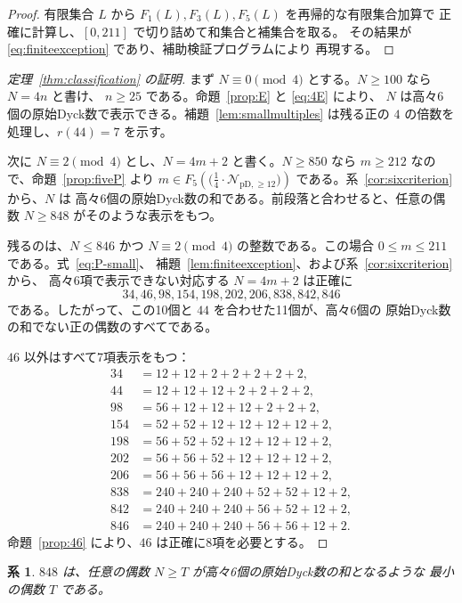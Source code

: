 \documentclass[12pt]{ltjsarticle}
\theoremstyle{plain}
\newtheorem{corollary}[theorem]{系}
\theoremstyle{definition}
\theoremstyle{plain}
\newcommand{\Pset}{%
  \bigl(\tfrac{1}{4}\cdot\mathcal{N}_{\mathrm{pD},\geq 12}\bigr)%
}
\begin{document}
\begin{proof}
有限集合 $L$ から $F_1(L),F_3(L),F_5(L)$ を再帰的な有限集合加算で
正確に計算し、$[0,211]$ で切り詰めて和集合と補集合を取る。
その結果が \eqref{eq:finiteexception} であり、補助検証プログラムにより
再現する。
\end{proof}

\begin{proof}[定理~\ref{thm:classification} の証明]
まず $N\equiv0\pmod4$ とする。$N\geq100$ なら $N=4n$ と書け、
$n\geq25$ である。命題~\ref{prop:E} と \eqref{eq:4E} により、
$N$ は高々6個の原始Dyck数で表示できる。補題~\ref{lem:smallmultiples}
は残る正の $4$ の倍数を処理し、$r(44)=7$ を示す。

次に $N\equiv2\pmod4$ とし、$N=4m+2$ と書く。$N\geq850$ なら
$m\geq212$ なので、命題~\ref{prop:fiveP} より
$m\in F_5(\Pset)$ である。系~\ref{cor:sixcriterion} から、$N$ は
高々6個の原始Dyck数の和である。前段落と合わせると、任意の偶数
$N\geq848$ がそのような表示をもつ。

残るのは、$N\leq846$ かつ $N\equiv2\pmod4$ の整数である。この場合
$0\leq m\leq211$ である。式~\eqref{eq:P-small}、
補題~\ref{lem:finiteexception}、および系~\ref{cor:sixcriterion} から、
高々6項で表示できない対応する $N=4m+2$ は正確に
\[
 34,46,98,154,198,202,206,838,842,846
\]
である。したがって、この10個と $44$ を合わせた11個が、高々6個の
原始Dyck数の和でない正の偶数のすべてである。

$46$ 以外はすべて7項表示をもつ：
\[
\begin{aligned}
34&=12+12+2+2+2+2+2,\\
44&=12+12+12+2+2+2+2,\\
98&=56+12+12+12+2+2+2,\\
154&=52+52+12+12+12+12+2,\\
198&=56+52+52+12+12+12+2,\\
202&=56+56+52+12+12+12+2,\\
206&=56+56+56+12+12+12+2,\\
838&=240+240+240+52+52+12+2,\\
842&=240+240+240+56+52+12+2,\\
846&=240+240+240+56+56+12+2.
\end{aligned}
\]
命題~\ref{prop:46} により、$46$ は正確に8項を必要とする。
\end{proof}

\begin{corollary}\label{cor:threshold}
$848$ は、任意の偶数 $N\geq T$ が高々6個の原始Dyck数の和となるような
最小の偶数 $T$ である。
\end{corollary}
\end{document}
